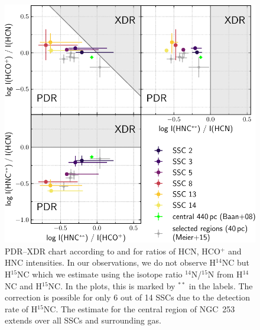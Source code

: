 \begin{figure}
    \centering
    \includegraphics[width=0.58\linewidth]{images/chapters/papers/SSCs/SSCs_XDR-PDR_integrated_intensity.pdf}
    \caption[PDR--XDR chart based on line intensities]{PDR--XDR chart according to \citet{Loenen:2008fb} and \citet{Baan:2008hx} for ratios of HCN, HCO$^+$ and HNC intensities. In our observations, we do not observe H$^{14}$NC but H$^{15}$NC which we estimate using the isotope ratio $^{14}$N/$^{15}$N from H$^{14}$NC and H$^{15}$NC. In the plots, this is marked by $^{**}$ in the labels. The correction is possible for only 6 out of 14 SSCs due to the detection rate of H$^{15}$NC. The \citet{Baan:2008hx} estimate for the central region of NGC~253 extends over all SSCs and surrounding gas.
    }
    \label{SSCs: figure: XDR PDR intensity}
\end{figure}